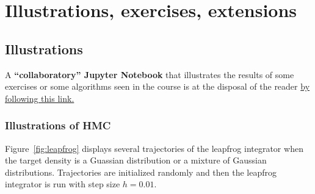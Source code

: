 \documentclass[english,graybox,envcountchap,envcountsame,sectrefs,shortlabels]{svmono}
\theoremstyle{style}
\begin{document}
%



\chapter{Illustrations, exercises, extensions}

\section{Illustrations}
A \textbf{``collaboratory'' Jupyter Notebook} that illustrates the
results of some exercises or some algorithms seen in the course is
at the disposal of the reader \href{https://colab.research.google.com/drive/1Ey5TNx-_74gPH0FG-rhXSuGGok0T10wS\#}{by following this link.}

\subsection{Illustrations of HMC}
Figure~\ref{fig:leapfrog} displays several trajectories of the leapfrog integrator when the target density is a Guassian distribution or a mixture of Gaussian distributions. Trajectories are initialized randomly and then the leapfrog integrator is run with step size $h= 0.01$.
\end{document}
